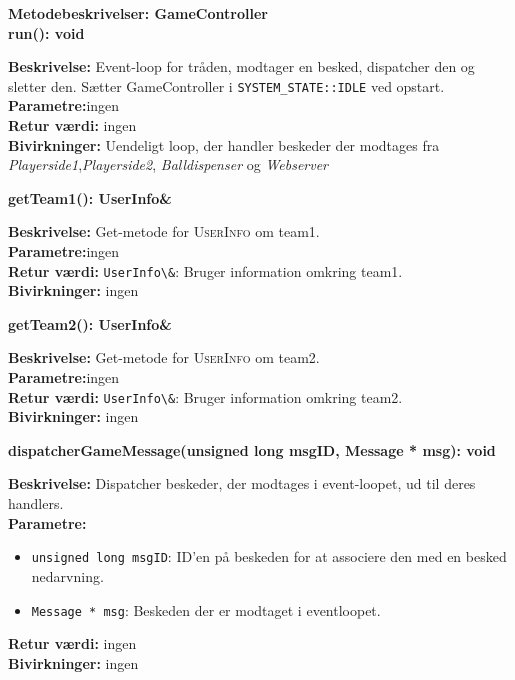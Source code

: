 \documentclass[Softwaredesign/Softwaredesign_main.tex]{subfiles}
\begin{document}
{\large\textbf{Metodebeskrivelser: GameController}}\\[0.2cm]
\textbf{run(): void}
\begin{adjustwidth}{1cm}{0pt}
\textbf{Beskrivelse:} Event-loop for tråden, modtager en besked, dispatcher den og sletter den. Sætter GameController i \lstinline{SYSTEM_STATE::IDLE} ved opstart.\\[0.2cm]
\textbf{Parametre:}ingen \\[0.2cm]
\textbf{Retur værdi:} ingen \\[0.2cm]
\textbf{Bivirkninger:} Uendeligt loop, der handler beskeder der modtages fra \textit{Playerside1},\textit{Playerside2}, \textit{Balldispenser} og \textit{Webserver}\\[0.2cm]
\end{adjustwidth}

\textbf{getTeam1(): UserInfo\&}
\begin{adjustwidth}{1cm}{0pt}
\textbf{Beskrivelse:}  Get-metode for \textsc{UserInfo} om team1.\\[0.2cm]
\textbf{Parametre:}ingen \\[0.2cm]
\textbf{Retur værdi:}
\lstinline{UserInfo\&}: Bruger information omkring team1.
\\[0.2cm]
\textbf{Bivirkninger:} ingen\\[0.2cm]
\end{adjustwidth}

\textbf{getTeam2(): UserInfo\&}
\begin{adjustwidth}{1cm}{0pt}
\textbf{Beskrivelse:}  Get-metode for \textsc{UserInfo} om team2.\\[0.2cm]
\textbf{Parametre:}ingen \\[0.2cm]
\textbf{Retur værdi:} \lstinline{UserInfo\&}: Bruger information omkring team2.
\\[0.2cm]
\textbf{Bivirkninger:} ingen\\[0.2cm]
\end{adjustwidth}

\textbf{dispatcherGameMessage(unsigned long msgID, Message * msg): void}
\begin{adjustwidth}{1cm}{0pt}
\textbf{Beskrivelse:}  Dispatcher beskeder, der modtages i event-loopet, ud til deres handlers.\\[0.2cm]
\textbf{Parametre:}
\begin{itemize}
    \item \lstinline{unsigned long msgID}: ID'en på beskeden for at associere den med en besked nedarvning.
    \item \lstinline{Message * msg}: Beskeden der er modtaget i eventloopet.
\end{itemize}
\textbf{Retur værdi:} ingen \\[0.2cm]
\textbf{Bivirkninger:} ingen\\[0.2cm]
\end{adjustwidth}
\end{document}
